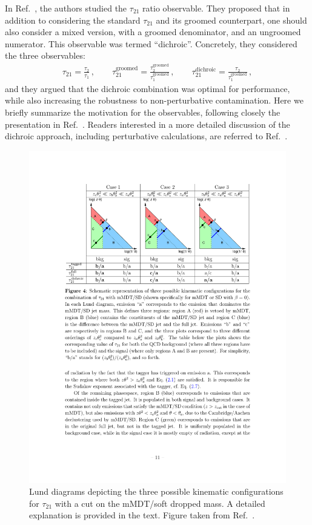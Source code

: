 \documentclass[11pt,letterpaper]{article}
\newcommand{\groomed}{\text{groomed}}
\DeclareRobustCommand{\Ref}[1]{Ref.~\cite{#1}}
\begin{document}
In \Ref{Salam:2016yht}, the authors studied the $\tau_{21}$ ratio observable.
%
They proposed that in addition to considering the standard $\tau_{21}$ and its groomed counterpart, one should also consider a mixed version, with a groomed denominator, and an ungroomed numerator.
%
This observable was termed ``dichroic''.
%
Concretely, they considered the three observables:
%
\begin{align}
 \tau_{21} =\frac{\tau_2}{\tau_1}  \,, \qquad \tau_{21}^{\text{groomed}} =\frac{\tau_2^\groomed}{\tau_1^\groomed}\,, \qquad \tau_{21}^{\text{dichroic}} =\frac{\tau_2}{\tau_1^\groomed}\,,
\end{align}
%
and they argued that the dichroic combination was optimal for performance, while also increasing the robustness to non-perturbative contamination.
%
Here we briefly summarize the motivation for the observables, following closely the presentation in \Ref{Salam:2016yht}. 
%
Readers interested in a more detailed discussion of the dichroic approach, including perturbative calculations, are referred to \Ref{Salam:2016yht}.

\begin{figure}[t]
\begin{center}
\includegraphics[width=0.9\columnwidth]{figures/dichroic_placeholder}
\end{center}
\caption{Lund diagrams depicting the three possible kinematic configurations for $\tau_{21}$ with a cut on the mMDT/soft dropped mass. A detailed explanation is provided in the text. Figure taken from \Ref{Salam:2016yht}.}
\label{fig:dichroic}
\end{figure}
\end{document}
